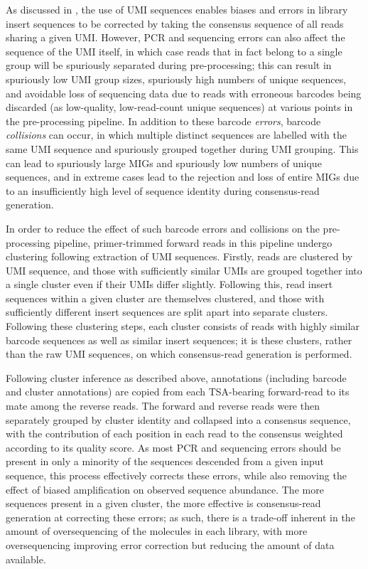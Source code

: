 As discussed in , the use of UMI sequences enables biases and errors in library insert sequences to be corrected by taking the consensus sequence of all reads sharing a given UMI. However, PCR and sequencing errors can also affect the sequence of the UMI itself, in which case reads that in fact belong to a single group will be spuriously separated during pre-processing; this can result in spuriously low UMI group sizes, spuriously high numbers of unique sequences, and avoidable loss of sequencing data due to reads with erroneous barcodes being discarded (as low-quality, low-read-count unique sequences) at various points in the pre-processing pipeline. In addition to these barcode \textit{errors}, barcode \textit{collisions} can occur, in which multiple distinct sequences are labelled with the same UMI sequence and spuriously grouped together during UMI grouping. This can lead to spuriously large MIGs and spuriously low numbers of unique sequences, and in extreme cases lead to the rejection and loss of entire MIGs due to an insufficiently high level of sequence identity during consensus-read generation.

In order to reduce the effect of such barcode errors and collisions on the pre-processing pipeline, primer-trimmed forward reads in this pipeline undergo clustering following extraction of UMI sequences. Firstly, reads are clustered by UMI sequence, and those with sufficiently similar UMIs are grouped together into a single cluster even if their UMIs differ slightly. Following this, read insert sequences within a given cluster are themselves clustered, and those with sufficiently different insert sequences are split apart into separate clusters. Following these clustering steps, each cluster consists of reads with highly similar barcode sequences as well as similar insert sequences; it is these clusters, rather than the raw UMI sequences, on which consensus-read generation is performed.

Following cluster inference as described above, annotations (including barcode and cluster annotations) are copied from each TSA-bearing forward-read to its mate among the reverse reads. The forward and reverse reads were then separately grouped by cluster identity and collapsed into a consensus sequence, with the contribution of each position in each read to the consensus weighted according to its quality score. %
As most PCR and sequencing errors should be present in only a minority of the sequences descended from a given input sequence, this process effectively corrects these errors, while also removing the effect of biased amplification on observed sequence abundance. The more sequences present in a given cluster, the more effective is consensus-read generation at correcting these errors; as such, there is a trade-off inherent in the amount of oversequencing of the molecules in each library, with more oversequencing improving error correction but reducing the amount of data available. %

